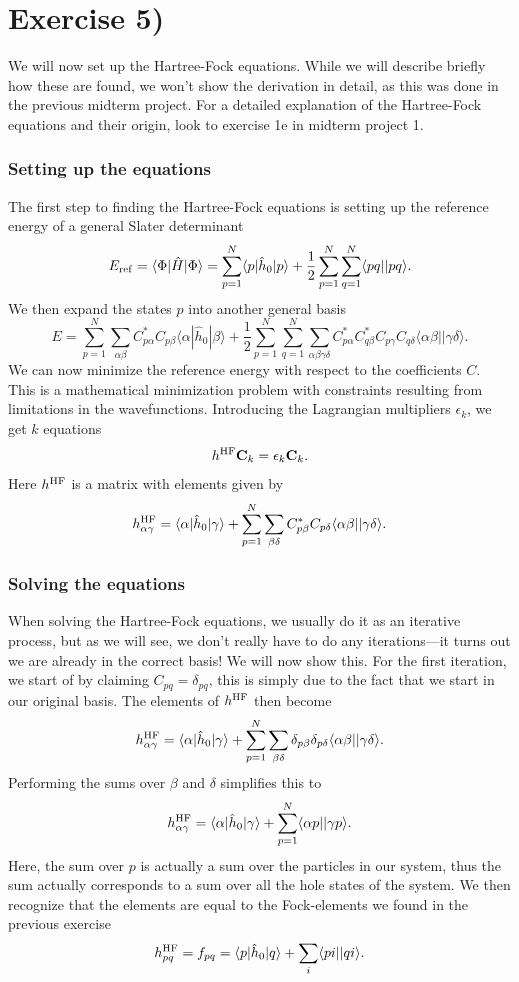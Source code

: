 \documentclass[a4paper, 11pt, notitlepage, english]{article}
\newcommand{\braket}[2]{\langle #1 | #2 \rangle}
\newcommand{\brakket}[2]{\langle #1 || #2 \rangle}
\newcommand{\op}[1]{\hat{#1}}
\newcommand{\braopket}[3]{\langle #1 | {#2} | #3 \rangle}
\newcommand{\eps}{\epsilon}
\begin{document}
\clearpage

\section*{Exercise 5)}

We will now set up the Hartree-Fock equations. While we will describe briefly how these are found, we won't show the derivation in detail, as this was done in the previous midterm project. For a detailed explanation of the Hartree-Fock equations and their origin, look to exercise 1e in midterm project 1.

\subsubsection*{Setting up the equations}

The first step to finding the Hartree-Fock equations is setting up the reference energy of a general Slater determinant
$$E_{\rm ref} = \braopket{\Phi}{\op{H}}{\Phi} = \sum_{p=1}^N \braopket{p}{\op{h}_0}{p} + \frac{1}{2}\sum_{p=1}^N\sum_{q=1}^N\braket{pq|}{pq}.$$
We then expand the states $p$ into another general basis
$$E = \sum_{p=1}^N \sum_{\alpha \beta} C^*_{p \alpha} C_{p \beta}\braopket{\alpha}{\op{h}_0}{\beta} + \frac{1}{2}\sum_{p=1}^N\sum_{q=1}^N\sum_{\alpha\beta\gamma\delta} C_{p\alpha}^* C_{q \beta}^* C_{p \gamma} C_{q \delta} \braket{\alpha\beta|}{\gamma\delta}.$$
We can now minimize the reference energy with respect to the coefficients $C$. This is a mathematical minimization problem with constraints resulting from limitations in the wavefunctions. Introducing the Lagrangian multipliers $\eps_k$, we get $k$ equations
$$h^{\rm HF} \mathbf{C}_k = \eps_k \mathbf{C}_k.$$
Here $h^{\rm HF}$ is a matrix with elements given by
$$h^{\rm HF}_{\alpha\gamma} = \braopket{\alpha}{\op{h}_0}{\gamma} + \sum_{p=1}^N\sum_{\beta\delta} C_{p\beta}^* C_{p \delta} \braket{\alpha\beta|}{\gamma\delta}.$$

\subsubsection*{Solving the equations}

When solving the Hartree-Fock equations, we usually do it as an iterative process, but as we will see, we don't really have to do any iterations---it turns out we are already in the correct basis! We will now show this. For the first iteration, we start of by claiming $C_{pq} = \delta_{pq}$, this is simply due to the fact that we start in our original basis. 
The elements of $h^{\rm HF}$ then become
$$h^{\rm HF}_{\alpha\gamma} = \braopket{\alpha}{\op{h}_0}{\gamma} + \sum_{p=1}^N\sum_{\beta\delta} \delta_{p\beta} \delta_{p \delta} \braket{\alpha\beta|}{\gamma\delta}.$$
Performing the sums over $\beta$ and $\delta$ simplifies this to
$$h^{\rm HF}_{\alpha\gamma} = \braopket{\alpha}{\op{h}_0}{\gamma} + \sum_{p=1}^N \brakket{\alpha p}{\gamma p}.$$
Here, the sum over $p$ is actually a sum over the particles in our system, thus the sum actually corresponds to a sum over all the hole states of the system. We then recognize that the elements are equal to the Fock-elements we found in the previous exercise
$$h^{\rm HF}_{pq} = f_{pq} = \braopket{p}{\op{h}_0}{q} + \sum_{i} \brakket{pi}{qi}.$$
\end{document}
